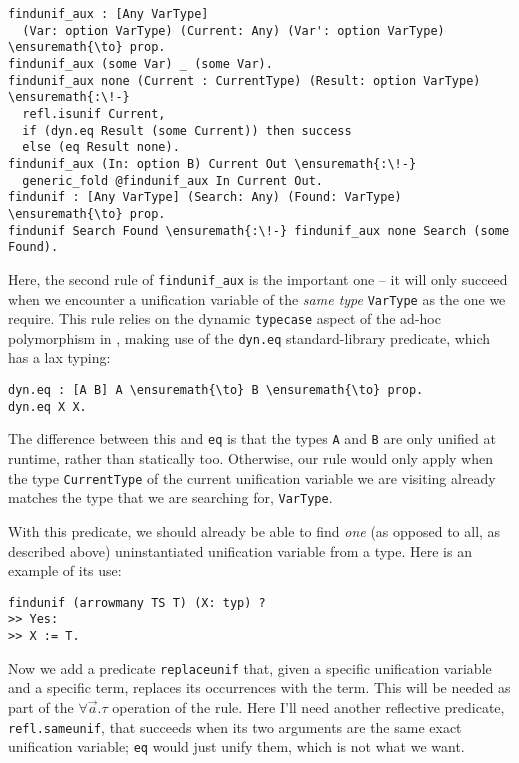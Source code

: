 \begin{verbatim}
findunif_aux : [Any VarType]
  (Var: option VarType) (Current: Any) (Var': option VarType) \ensuremath{\to} prop.
findunif_aux (some Var) _ (some Var).
findunif_aux none (Current : CurrentType) (Result: option VarType) \ensuremath{:\!-}
  refl.isunif Current,
  if (dyn.eq Result (some Current)) then success
  else (eq Result none).
findunif_aux (In: option B) Current Out \ensuremath{:\!-}
  generic_fold @findunif_aux In Current Out.
findunif : [Any VarType] (Search: Any) (Found: VarType) \ensuremath{\to} prop.
findunif Search Found \ensuremath{:\!-} findunif_aux none Search (some Found).
\end{verbatim}

Here, the second rule of \texttt{findunif\_aux} is the important one --
it will only succeed when we encounter a unification variable of the
\emph{same type} \texttt{VarType} as the one we require. This rule
relies on the dynamic \texttt{typecase} aspect of the ad-hoc
polymorphism in \lamprolog, making use of the \texttt{dyn.eq}
standard-library predicate, which has a lax typing:

\begin{verbatim}
dyn.eq : [A B] A \ensuremath{\to} B \ensuremath{\to} prop.
dyn.eq X X.
\end{verbatim}

The difference between this and \texttt{eq} is that the types \texttt{A}
and \texttt{B} are only unified at runtime, rather than statically too.
Otherwise, our rule would only apply when the type \texttt{CurrentType}
of the current unification variable we are visiting already matches the
type that we are searching for, \texttt{VarType}.

With this predicate, we should already be able to find \emph{one} (as
opposed to all, as described above) uninstantiated unification variable
from a type. Here is an example of its use:

\begin{verbatim}
findunif (arrowmany TS T) (X: typ) ?
>> Yes:
>> X := T.
\end{verbatim}

Now we add a predicate \texttt{replaceunif} that, given a specific
unification variable and a specific term, replaces its occurrences with
the term. This will be needed as part of the \(\forall \vec{a}.\tau\)
operation of the rule. Here I'll need another reflective predicate,
\texttt{refl.sameunif}, that succeeds when its two arguments are the
same exact unification variable; \texttt{eq} would just unify them,
which is not what we want.

